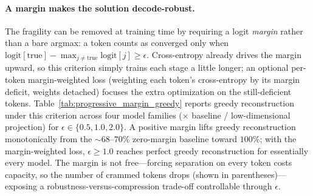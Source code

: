 \paragraph{A margin makes the solution decode-robust.}
The fragility can be removed at training time by requiring a logit \emph{margin} rather than a bare argmax: a token counts as converged only when $\mathrm{logit}[\text{true}] - \max_{j \neq \text{true}} \mathrm{logit}[j] \geq \epsilon$. Cross-entropy already drives the margin upward, so this criterion simply trains each stage a little longer; an optional per-token margin-weighted loss (weighting each token's cross-entropy by its margin deficit, weights detached) focuses the extra optimization on the still-deficient tokens. Table~\ref{tab:progressive_margin_greedy} reports greedy reconstruction under this criterion across four model families ($\times$ baseline / low-dimensional projection) for $\epsilon \in \{0.5, 1.0, 2.0\}$. A positive margin lifts greedy reconstruction monotonically from the $\sim\!68$--$70\%$ zero-margin baseline toward $100\%$; with the margin-weighted loss, $\epsilon \geq 1.0$ reaches perfect greedy reconstruction for essentially every model. The margin is not free---forcing separation on every token costs capacity, so the number of crammed tokens drops (shown in parentheses)---exposing a robustness-versus-compression trade-off controllable through $\epsilon$.

\begin{table}[t]
\centering
\caption{Greedy autoregressive reconstruction accuracy (\%) of progressive-cramming embeddings trained with a convergence margin $\epsilon$, over $50$ PG19 samples; the mean number of compressed tokens is shown in parentheses. ``CE'' is the plain margin criterion and ``+LM'' additionally reweights the cross-entropy toward margin-deficient tokens. The zero-margin ($\epsilon{=}0$) baselines reconstruct at only $\sim\!68$--$70\%$ (Pythia-1.4B $70.5$, Llama-3.1-8B $68.5$) despite $100\%$ teacher forcing. A larger $\epsilon$ trades crammed tokens for decode robustness.}
\label{tab:progressive_margin_greedy}
\begin{small}

\end{small}
\vskip -0.1in
\end{table}

